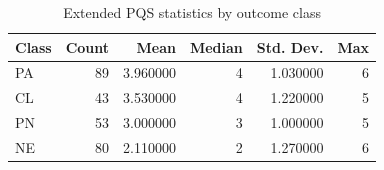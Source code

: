 \begin{table}
\caption{Extended PQS statistics by outcome class}
\label{tab:extended-pqs-by-outcome}
\begin{tabular}{lrrrrr}
\toprule
Class & Count & Mean & Median & Std. Dev. & Max \\
\midrule
PA & 89 & 3.960000 & 4 & 1.030000 & 6 \\
CL & 43 & 3.530000 & 4 & 1.220000 & 5 \\
PN & 53 & 3.000000 & 3 & 1.000000 & 5 \\
NE & 80 & 2.110000 & 2 & 1.270000 & 6 \\
\bottomrule
\end{tabular}
\end{table}
